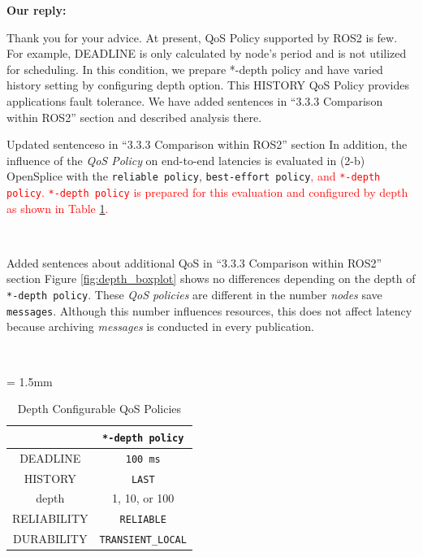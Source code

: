 \documentclass{article}
\begin{document}
\begin{enumerate}
  \begin{flushleft}
    \textbf{Our reply:}
  \end{flushleft}
  Thank you for your advice.
  At present, QoS Policy supported by ROS2 is few.
  For example, DEADLINE is only calculated by node's period and is not utilized for scheduling.
  In this condition, we prepare *-depth policy and have varied history setting by configuring depth option.
  This HISTORY QoS Policy provides applications fault tolerance.
  We have added sentences in ``3.3.3 Comparison within ROS2'' section and described analysis there.
  \begin{itembox}[|]{Updated sentenceso in ``3.3.3 Comparison within ROS2'' section}
    In addition, the influence of the \emph{QoS Policy} on end-to-end latencies is evaluated in (2-b) OpenSplice with the \texttt{reliable policy}, \texttt{best-effort policy}\textcolor{red}{, and \texttt{*-depth policy}.
    \texttt{*-depth policy} is prepared for this evaluation and configured by depth as shown in Table \ref{tb:depth_qos}.}
  \end{itembox}\\
  \begin{itembox}[|]{Added sentences about additional QoS in ``3.3.3 Comparison within ROS2'' section}
    Figure \ref{fig:depth_boxplot} shows no differences depending on the depth of \texttt{*-depth policy}.
    These \emph{QoS policies} are different in the number \emph{nodes} save \texttt{messages}.
    Although this number influences resources, this does not affect latency because archiving \emph{messages} is conducted in every publication.
  \end{itembox}\\
  \renewcommand{\arraystretch}{1.0}
  \setcounter{table}{4}
  \begin{table}[H]
    \caption{\label{tb:depth_qos}Depth Configurable QoS Policies}
    \centering
    \tabcolsep = 1.5mm              %
    \begin{tabular}{c|c}
      \hline
      & \textbf{\texttt{*-depth policy} }\\
      \hline
      \hline
      DEADLINE & \texttt{100 ms}\\
      HISTORY & \texttt{LAST}\\
      depth & 1, 10, or 100\\
      RELIABILITY & \texttt{RELIABLE}\\
      DURABILITY & \texttt{TRANSIENT\_LOCAL}\\
      \hline
    \end{tabular}

\end{table}
\end{enumerate}
\end{document}
